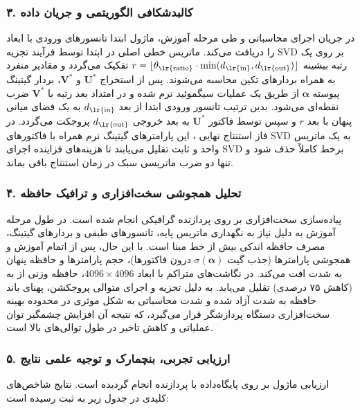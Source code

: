 \subsubsection*{۳. کالبدشکافی الگوریتمی و جریان داده }
در جریان اجرای محاسباتی و طی مرحله آموزش، ماژول ابتدا تانسورهای ورودی با ابعاد  را دریافت می‌کند. ماتریس خطی اصلی در ابتدا توسط فرآیند تجزیه SVD بر روی یک رتبه بیشینه $r = \lfloor \theta_{\text{\lr{ratio}}} \cdot \min(d_{\text{\lr{in}}}, d_{\text{\lr{out}}}) \rfloor$ تفکیک می‌گردد و مقادیر منفرد به همراه بردارهای تکین محاسبه می‌شوند.
پس از استخراج $\mathbf{U}^*$ و $\mathbf{V}^*$، بردار گیتینگ پیوسته $\boldsymbol{\alpha}$ از طریق یک عملیات سیگموئید نرم شده و در امتداد بعد رتبه با $\mathbf{V}^*$ ضرب نقطه‌ای  می‌شود. بدین ترتیب تانسور ورودی ابتدا از بعد $d_{\text{\lr{in}}}$ به یک فضای میانی پنهان با بعد $r$ و سپس توسط فاکتور $\mathbf{U}^*$ به بعد خروجی $d_{\text{\lr{out}}}$ پروجکت می‌گردد. در فاز استنتاج نهایی ، این پارامترهای گیتینگ نرم همراه با فاکتورهای SVD به یک ماتریس واحد و ثابت تقلیل می‌یابند تا هزینه‌های فزاینده اجرای SVD برخط کاملاً حذف شود و تنها دو ضرب ماتریسی سبک در زمان استنتاج باقی بماند.

\subsubsection*{۴. تحلیل همجوشی سخت‌افزاری و ترافیک حافظه }
پیاده‌سازی سخت‌افزاری  بر روی پردازنده گرافیکی  انجام شده است. در طول مرحله آموزش به دلیل نیاز به نگهداری ماتریس پایه، تانسورهای طیفی و بردارهای گیتینگ، مصرف حافظه  اندکی بیش از خط مبنا است. با این حال، پس از اتمام آموزش و همجوشی پارامترها (جذب گیت $\sigma(\boldsymbol{\alpha})$ درون فاکتورها)، حجم پارامترها و حافظه پنهان  به شدت افت می‌کند. 
در نگاشت‌های متراکم با ابعاد $4096 \times 4096$، حافظه وزنی از  به  (کاهش ۷۵ درصدی) تقلیل می‌یابد. به دلیل تجزیه و اجرای متوالی پروجکشن، پهنای باند حافظه  به شدت آزاد شده و شدت محاسباتی به شکل موثری در محدوده بهینه سخت‌افزاری دستگاه پردازشگر قرار می‌گیرد، که نتیجه آن افزایش چشمگیر توان عملیاتی و کاهش تاخیر در طول توالی‌های بالا است.

\subsubsection*{۵. ارزیابی تجربی، بنچمارک و توجیه علمی نتایج}
ارزیابی ماژول  بر روی پایگاه‌داده  با پردازنده  انجام گردیده است. نتایج شاخص‌های کلیدی در جدول زیر به ثبت رسیده است:

